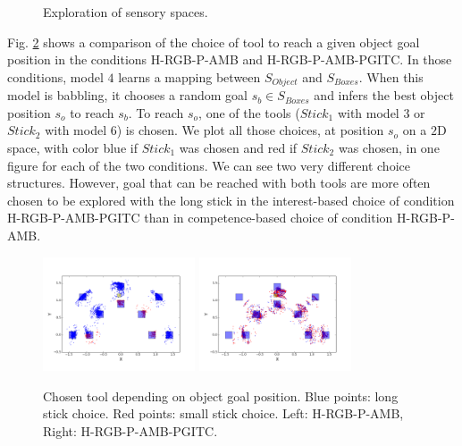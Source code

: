 \documentclass[10pt,letterpaper]{article}
\begin{document}
\begin{figure}[ht]
		\caption{Exploration of sensory spaces.}
		\label{res_explo}
	\end{figure}

	Fig. \ref{res_choice} shows a comparison of the choice of tool to reach a given object goal position in the conditions H-RGB-P-AMB and H-RGB-P-AMB-PGITC.
	In those conditions, model $4$ learns a mapping between $S_{Object}$ and $S_{Boxes}$. 
	When this model is babbling, it chooses a random goal $s_b \in S_{Boxes}$ and infers the best object position $s_o$ to reach $s_b$.
	To reach $s_o$, one of the tools ($Stick_1$ with model $3$ or $Stick_2$ with model $6$) is chosen. 
	We plot all those choices, at position $s_o$ on a $2$D space, with color blue if $Stick_1$ was chosen and red if $Stick_2$ was chosen, in one figure for each of the two conditions.
	We can see two very different choice structures.
	However, goal that can be reached with both tools are more often chosen to be explored with the long stick in the interest-based choice of condition H-RGB-P-AMB-PGITC than in competence-based choice of condition H-RGB-P-AMB.
	
	\begin{figure}[ht]
		\centering
		\includegraphics[width=4.5cm]{./include/H-RGB-P-AMB-log9-choice_mod4.png}
		\hspace{-0.6cm}
		\includegraphics[width=4.5cm]{./include/H-RGB-P-AMB-PGITC-log3-choice_mod4.png}
		\caption{Chosen tool depending on object goal position. Blue points: long stick choice. Red points: small stick choice. Left: H-RGB-P-AMB, Right: H-RGB-P-AMB-PGITC.}
		\label{res_choice}
	\end{figure}
	
\end{document}
